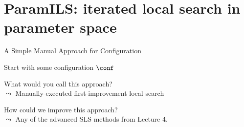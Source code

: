 \section{ParamILS: iterated local search in parameter space}


\begin{frame}[c,fragile]{A Simple Manual Approach for Configuration}

%
%
%

\NoCaptionOfAlgo
\LinesNotNumbered
\begin{algorithm}[H]
        Start with some configuration $\conf$\;
\caption{\textbf{Algorithm 1: Manual Greedy Algorithm Configuration}}
\end{algorithm}

\medskip
What would you call this approach? \hands\\
\smallskip
{}
$\leadsto$ Manually-executed \alert{first-improvement local search}

\medskip

How could we improve this approach?\hands\\ 
\smallskip
{}
$\leadsto$ Any of the advanced SLS methods from Lecture 4.

\end{frame}




